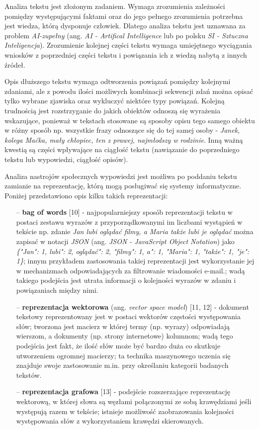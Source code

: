 Analiza tekstu jest złożonym zadaniem. Wymaga zrozumienia zależności pomiędzy występującymi faktami oraz do jego pełnego zrozumienia potrzebna jest wiedza, którą dysponuje człowiek. Dlatego analiza tekstu jest uznawana za problem \textit{AI-zupełny} (ang. \textit{AI - Artifical Intelligence} lub po polsku \textit{SI - Sztuczna Inteligencja}). Zrozumienie kolejnej części tekstu wymaga umiejętnego wyciągania wniosków z poprzedniej części tekstu i powiązania ich z wiedzą nabytą z innych źródeł. 

Opis dłuższego tekstu wymaga odtworzenia powiązań pomiędzy kolejnymi zdaniami, ale z powodu ilości możliwych kombinacji sekwencji zdań można opisać tylko wybrane zjawiska oraz wykluczyć niektóre typy powiązań. Kolejną trudnością jest rozstrzyganie do jakich obiektów odnoszą się wyrażenia wskazujące, ponieważ w tekstach stosowane są sposoby opisu tego samego obiektu w różny sposób np. wszystkie frazy odnoszące się do tej samej osoby - \textit{Janek, kolega Maćka, mały chłopiec, ten z prawej, najmłodszy w rodzinie}. Inną ważną kwestią są części wpływające na ciągłość tekstu (nawiązanie do poprzedniego tekstu lub wypowiedzi, ciągłość opisów).

Analiza nastrojów społecznych wypowiedzi jest możliwa po poddaniu tekstu zamianie na reprezentację, którą mogą posługiwać się systemy informatyczne. Poniżej przedstawiono opis kilku takich reprezentacji:
\begin{itemize}
	\item[--] \textbf{bag of words} [10] - najpopularniejszy sposób reprezentacji tekstu w postaci zestawu wyrazów z przyporządkowanymi im liczbami wystąpień w tekście np. zdanie \textit{Jan lubi oglądać filmy, a Maria także lubi je oglądać} można zapisać w notacji \textit{JSON} (ang. \textit{JSON - JavaScript Object Notation}) jako \textit{\{"Jan": 1, \textquotesingle \textquotesingle lubi": 2, \textquotesingle \textquotesingle oglądać": 2, "filmy": 1, \textquotesingle \textquotesingle a": 1, "Maria": 1, "także": 1, "je": 1\}}; innym przykładem zastosowania takiej reprezentacji jest wykorzystanie jej w mechanizmach odpowiadających za filtrowanie wiadomości e-mail.; wadą takiego podejścia jest utrata informacji o kolejności wyrazów w zdaniu i powiązaniach między nimi.
	\item[--] \textbf{reprezentacja wektorowa} (ang. \textit{vector space model}) [11, 12] - dokument tekstowy reprezentowany jest w postaci wektorów częstości występowania słów; tworzona jest macierz w której termy (np. wyrazy) odpowiadają wierszom, a dokumenty (np. strony internetowe) kolumnom; wadą tego podejścia jest fakt, że ilość słów może być bardzo duża co skutkuje utworzeniem ogromnej macierzy; ta technika maszynowego uczenia się znajduje swoje zastosowanie m.in. przy określaniu kategorii badanych tekstów.
	\item[--] \textbf{reprezentacja grafowa} [13] - podejście rozszerzające reprezentację wektorową, w której słowa są węzłami połączonymi ze sobą krawędziami jeśli występują razem w tekście; istnieje możliwość zaobrazowania kolejności występowania słów z wykorzystaniem krawędzi skierowanych.
\end{itemize}

